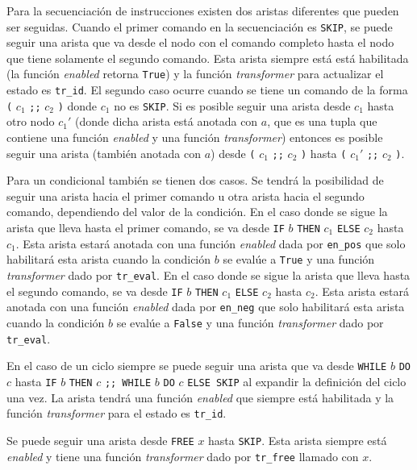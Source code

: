 Para la secuenciación de instrucciones existen dos aristas diferentes que pueden ser seguidas.
Cuando el primer comando en la secuenciación es \verb|SKIP|, se puede seguir una arista que va desde el nodo con el comando completo hasta el nodo que tiene solamente el segundo comando.
Esta arista siempre está está habilitada (la función \textit{enabled} retorna \verb|True|) y la función \textit{transformer} para actualizar el estado es \verb|tr_id|.
El segundo caso ocurre cuando se tiene un comando de la forma \verb|(| $c_{1}$ \verb|;;| $c_{2}$ \verb|)| donde $c_{1}$ no es \verb|SKIP|.
Si es posible seguir una arista desde $c_{1}$ hasta otro nodo $c_{1}'$ (donde dicha arista está anotada con $a$, que es una tupla que contiene una función \textit{enabled} y una función \textit{transformer}) entonces es posible seguir una arista (también anotada con $a$) desde \verb|(| $c_{1}$ \verb|;;| $c_{2}$ \verb|)| hasta \verb|(| $c_{1}'$ \verb|;;| $c_{2}$ \verb|)|.

Para un condicional también se tienen dos casos.
Se tendrá la posibilidad de seguir una arista hacia el primer comando u otra arista hacia el segundo comando, dependiendo del valor de la condición.
En el caso donde se sigue la arista que lleva hasta el primer comando, se va desde \verb|IF| $b$ \verb|THEN| $c_{1}$ \verb|ELSE| $c_{2}$ hasta $c_{1}$.
Esta arista estará anotada con una función \textit{enabled} dada por \verb|en_pos| que solo habilitará esta arista cuando la condición $b$ se evalúe a \verb|True| y una función \textit{transformer} dado por \verb|tr_eval|.
En el caso donde se sigue la arista que lleva hasta el segundo comando, se va desde \verb|IF| $b$ \verb|THEN| $c_{1}$ \verb|ELSE| $c_{2}$ hasta $c_{2}$.
Esta arista estará anotada con una función \textit{enabled} dada por \verb|en_neg| que solo habilitará esta arista cuando la condición $b$ se evalúe a \verb|False| y una función \textit{transformer} dado por \verb|tr_eval|.

En el caso de un ciclo siempre se puede seguir una arista que va desde \verb|WHILE| $b$ \verb|DO| $c$ hasta \verb|IF| $b$ \verb|THEN| $c$ \verb|;; WHILE| $b$ \verb|DO| $c$ \verb|ELSE SKIP| al expandir la definición del ciclo una vez.
La arista tendrá una función \textit{enabled} que siempre está habilitada y la función \textit{transformer} para el estado es \verb|tr_id|.

Se puede seguir una arista desde \verb|FREE| $x$ hasta \verb|SKIP|.
Esta arista siempre está \textit{enabled} y tiene una función \textit{transformer} dado por \verb|tr_free| llamado con $x$.

